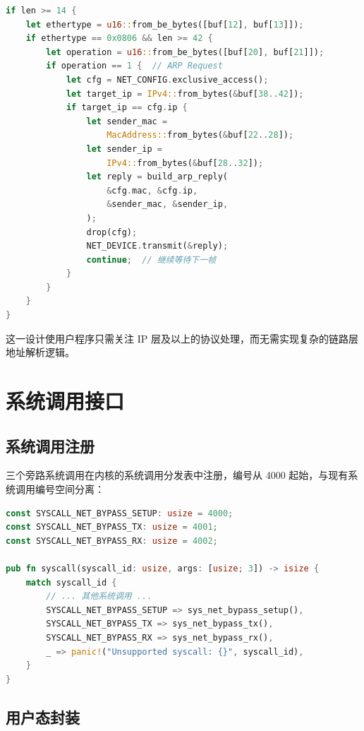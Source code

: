 \begin{lstlisting}[language=Rust, caption={ARP 请求的透明应答}]
if len >= 14 {
    let ethertype = u16::from_be_bytes([buf[12], buf[13]]);
    if ethertype == 0x0806 && len >= 42 {
        let operation = u16::from_be_bytes([buf[20], buf[21]]);
        if operation == 1 {  // ARP Request
            let cfg = NET_CONFIG.exclusive_access();
            let target_ip = IPv4::from_bytes(&buf[38..42]);
            if target_ip == cfg.ip {
                let sender_mac =
                    MacAddress::from_bytes(&buf[22..28]);
                let sender_ip =
                    IPv4::from_bytes(&buf[28..32]);
                let reply = build_arp_reply(
                    &cfg.mac, &cfg.ip,
                    &sender_mac, &sender_ip,
                );
                drop(cfg);
                NET_DEVICE.transmit(&reply);
                continue;  // 继续等待下一帧
            }
        }
    }
}
\end{lstlisting}

这一设计使用户程序只需关注 IP 层及以上的协议处理，而无需实现复杂的链路层地址解析逻辑。

\section{系统调用接口}

\subsection{系统调用注册}

三个旁路系统调用在内核的系统调用分发表中注册，编号从 4000 起始，与现有系统调用编号空间分离：

\begin{lstlisting}[language=Rust, caption={系统调用编号定义与分发}]
const SYSCALL_NET_BYPASS_SETUP: usize = 4000;
const SYSCALL_NET_BYPASS_TX: usize = 4001;
const SYSCALL_NET_BYPASS_RX: usize = 4002;

pub fn syscall(syscall_id: usize, args: [usize; 3]) -> isize {
    match syscall_id {
        // ... 其他系统调用 ...
        SYSCALL_NET_BYPASS_SETUP => sys_net_bypass_setup(),
        SYSCALL_NET_BYPASS_TX => sys_net_bypass_tx(),
        SYSCALL_NET_BYPASS_RX => sys_net_bypass_rx(),
        _ => panic!("Unsupported syscall: {}", syscall_id),
    }
}
\end{lstlisting}

\subsection{用户态封装}

